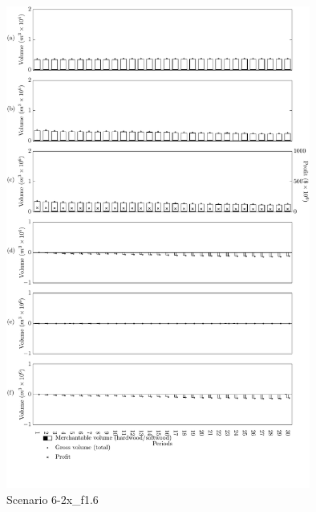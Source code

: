 \begin{figure}[h]
  \centering
  \includegraphics[width=10cm]{images/appendix/s6-2x_test10}
  \caption{Scenario 6-2x\_f1.6}
  \label{fig:s6-2x_test10}
\end{figure}

